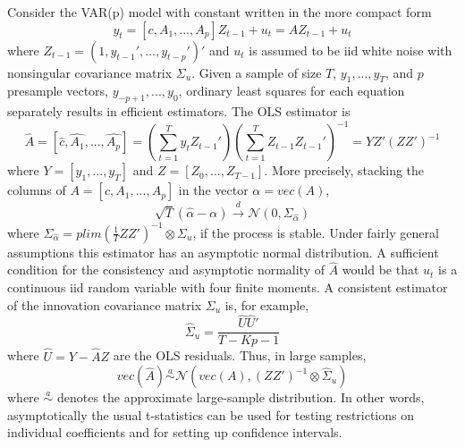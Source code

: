 Consider the VAR(p) model with constant written in the more compact form
$$ y_t = [c, A_1, ..., A_p] Z_{t-1} + u_t = A Z_{t-1}+ u_t$$
where $Z_{t-1}=(1,y_{t-1}',...,y_{t-p}')'$ and $u_t$ is assumed to be iid white noise with nonsingular covariance matrix $\Sigma_u$. Given a sample of size $T$, $y_1,...,y_T$, and $p$ presample vectors, $y_{-p+1},...,y_{0}$, ordinary least squares for each equation separately results in efficient estimators. The OLS estimator is
$$\hat{A} = \left[ \hat{c}, \hat{A_1},...,\hat{A_p}\right] = \left(\sum_{t=1}^{T}y_t Z_{t-1}'\right)\left(\sum_{t=1}^{T}Z_{t-1}Z_{t-1}'\right)^{-1} = Y Z'(ZZ')^{-1}$$
where $Y=[y_1,...,y_T]$ and $Z=[Z_0,...,Z_{T-1}]$. More precisely, stacking the columns of $A = [c, A_1,...,A_p]$ in the vector $\alpha = vec(A)$,
$$\sqrt{T}\left(\hat{\alpha} - \alpha \right) \overset{d}{\rightarrow} \mathcal{N}(0, \Sigma_{\hat{\alpha}})$$
where $\Sigma_{\hat{\alpha}} = plim(\frac{1}{T}ZZ')^{-1}\otimes \Sigma_u$, if the process is stable. Under fairly general assumptions this estimator has an asymptotic normal distribution. A sufficient condition for the consistency and asymptotic normality of $\hat{A}$ would be that $u_t$ is a continuous iid random variable with four finite moments. A consistent estimator of the innovation covariance matrix $\Sigma_u$ is, for example,
$$\hat{\Sigma}_u = \frac{\hat{U}\hat{U}'}{T-Kp-1}$$
where $\hat{U} = Y - \hat{A}Z$ are the OLS residuals. Thus, in large samples,
$$vec(\hat{A}) \overset{a}{\sim}\mathcal{N}(vec(A),(ZZ')^{-1}\otimes \hat{\Sigma}_u)$$
where $\overset{a}{\sim}$  denotes the approximate large-sample distribution. In other words,
asymptotically the usual t-statistics can be used for testing restrictions on individual coefficients and for setting up confidence intervals.
